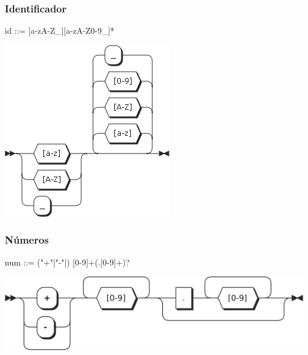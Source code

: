 \subsubsection{Identificador}
\begin{multicols}{2}
\begin{myverbatim}      
id ::= [a-zA-Z_][a-zA-Z0-9_]*
\end{myverbatim}  
\columnbreak	
\begin{center}
\includegraphics[scale=0.4]{diagram/id.png} \\
\end{center}
\end{multicols}

\subsubsection{Números}
\begin{multicols}{2}
\begin{myverbatim}      
num ::=  ("+"|"-"|) [0-9]+(.[0-9]+)?
\end{myverbatim}  
\columnbreak	
\begin{center}
\includegraphics[scale=0.5]{diagram/num.png} \\
\end{center}
\end{multicols}
